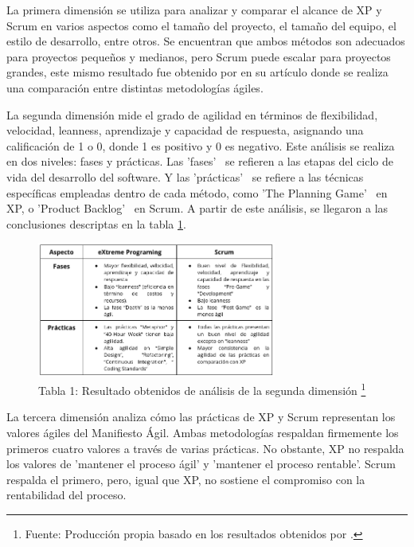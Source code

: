 \documentclass[a4paper,10pt]{article}
\begin{document}
	La primera dimensión se utiliza para analizar y comparar el alcance de XP y Scrum en varios aspectos como el tamaño del proyecto, el tamaño del equipo, el estilo de desarrollo, entre otros. Se encuentran que ambos métodos son adecuados para proyectos pequeños y medianos, pero Scrum puede escalar para proyectos grandes, este mismo resultado fue obtenido por \textcite{quinonez2017analisis} en su artículo donde se realiza una comparación entre distintas metodologías ágiles.
	
	La segunda dimensión mide el grado de agilidad en términos de flexibilidad, velocidad, leanness, aprendizaje y capacidad de respuesta, asignando una calificación de 1 o 0, donde 1 es positivo y 0 es negativo. Este análisis se realiza en dos niveles: fases y prácticas. Las 'fases' \ se refieren a las etapas del ciclo de vida del desarrollo del software. Y las 'prácticas' \ se refiere a las técnicas específicas empleadas dentro de cada método, como 'The Planning Game' \ en XP, o 'Product Backlog' \ en Scrum. A partir de este análisis, se llegaron a las conclusiones descriptas en la tabla \ref{tabla_resultado_2daDimencon_4D}.
	\begin{figure}[h]
		\centering
		\includegraphics[width=0.7\textwidth]{tabla-resultados-segunda-fase.png}
		\caption[Tabla resultados 4D]{Tabla 1: Resultado obtenidos de análisis de la segunda dimensión \footnote{Fuente: Producción propia basado en los resultados obtenidos por \textcite{Gill_Henderson-Sellers_2006}.}}
		\label{tabla_resultado_2daDimencon_4D}
	\end{figure}
	
	La tercera dimensión analiza cómo las prácticas de XP y Scrum representan los valores ágiles del Manifiesto Ágil. Ambas metodologías respaldan firmemente los primeros cuatro valores a través de varias prácticas. No obstante, XP no respalda los valores de 'mantener el proceso ágil' y 'mantener el proceso rentable'. Scrum respalda el primero, pero, igual que XP, no sostiene el compromiso con la rentabilidad del proceso.
	
\end{document}
